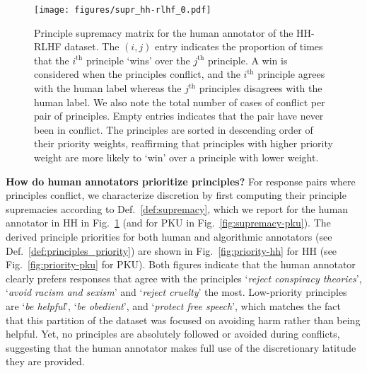 \documentclass{article}
\begin{document}
\begin{figure}[p]
    \centering
    \texttt{[image: figures/supr\_hh-rlhf\_0.pdf]}
    \caption{Principle supremacy matrix for the human annotator of the HH-RLHF dataset. The $(i, j)$ entry indicates the proportion of times that the $i^{\text{th}}$ principle `wins' over the $j^{\text{th}}$ principle. A win is considered when the principles conflict, and the $i^{\text{th}}$ principle agrees with the human label whereas the $j^{\text{th}}$ principles disagrees with the human label. We also note the total number of cases of conflict per pair of principles. Empty entries indicates that the pair have never been in conflict. The principles are sorted in descending order of their priority weights, reaffirming that principles with higher priority weight are more likely to `win' over a principle with lower weight.}
    \label{fig:supremacy-hh}
\end{figure}


\noindent\textbf{How do human annotators prioritize principles?}
For response pairs where principles conflict, we characterize discretion by first computing their principle supremacies according to Def.~\ref{def:supremacy}, which we report for the human annotator in HH in Fig.~\ref{fig:supremacy-hh} (and for PKU in Fig.~\ref{fig:supremacy-pku}). 
The derived principle priorities for both human and algorithmic annotators (see Def.~\ref{def:principles_priority}) are shown in Fig.~\ref{fig:priority-hh} for HH (see Fig.~\ref{fig:priority-pku} for PKU). Both figures indicate that the human annotator clearly prefers responses that agree with the principles `\textit{reject conspiracy theories}', `\textit{avoid racism and sexism}' and `\textit{reject cruelty}' the most. Low-priority principles are `\textit{be helpful}', `\textit{be obedient}', and `\textit{protect free speech}', which matches the fact that this partition of the dataset was focused on avoiding harm rather than being helpful. Yet, no principles are absolutely followed or avoided during conflicts, suggesting that the human annotator makes full use of the discretionary latitude they are provided.
\end{document}
